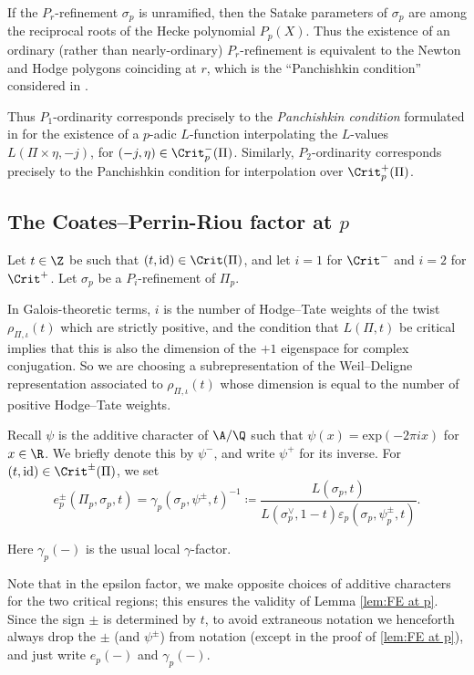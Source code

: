 \documentclass[10pt,reqno,a4paper]{amsart}
\begin{document}
  If the $P_r$-refinement $\sigma_p$ is unramified, then the Satake parameters of $\sigma_p$ are among the reciprocal roots of the Hecke polynomial $P_p(X)$. Thus the existence of an ordinary (rather than nearly-ordinary) $P_r$-refinement is equivalent to the Newton and Hodge polygons coinciding at $r$, which is the ``Panchishkin condition'' considered in \cite[Definition 5.5]{Pan94}.

  Thus $P_1$-ordinarity corresponds precisely to the \emph{Panchishkin condition} formulated in \cite{Pan94} for the existence of a $p$-adic $L$-function interpolating the $L$-values $L(\Pi \times \eta, -j)$, for $(-j, \eta) \in \Crit^-_p(\Pi)$. Similarly, $P_2$-ordinarity corresponds precisely to the Panchishkin condition for interpolation over $\Crit^+_p(\Pi)$.


 \subsection{The Coates--Perrin-Riou factor at \texorpdfstring{$p$}{p}}
  \label{sec:coates--perrin-riou}
  
  Let $t \in \Z$ be such that $(t, \mathrm{id}) \in \Crit(\Pi)$, and let $i = 1$ for $\Crit^-$ and $i = 2$ for $\Crit^+$. Let $\sigma_p$ be a $P_i$-refinement of $\Pi_p$.
  

  \begin{remark}
   In Galois-theoretic terms, $i$ is the number of Hodge--Tate weights of the twist $\rho_{\Pi, \iota}(t)$ which are strictly positive, and the condition that $L(\Pi, t)$ be critical implies that this is also the dimension of the $+1$ eigenspace for complex conjugation. So we are choosing a subrepresentation of the Weil--Deligne representation associated to $\rho_{\Pi, \iota}(t)$ whose dimension is equal to the number of positive Hodge--Tate weights.
  \end{remark}
  

  \begin{definition}\label{def:e_p}
  Recall $\psi$ is the additive character of $\A/\Q$ such that $\psi(x) = \mathrm{exp}(-2\pi i x)$ for $x \in \R$. We briefly denote this by $\psi^-$, and write $\psi^+$ for its inverse. 
   For $(t, \mathrm{id}) \in \Crit^\pm(\Pi)$, we set
   \[ e_p^\pm(\Pi_p, \sigma_p, t) = \gamma_p(\sigma_p, \psi^\pm, t)^{-1} \coloneqq \frac{L(\sigma_p, t)}{L(\sigma_p^\vee, 1 - t)\varepsilon_p(\sigma_p, \psi_p^\pm, t)} .\]
  \end{definition}

\begin{remark}
	    Here $\gamma_p(-)$ is the usual local $\gamma$-factor. 
	    
	    Note that in the epsilon factor, we make opposite choices of additive characters for the two critical regions; this ensures the validity of Lemma \ref{lem:FE at p}. 
	    Since the sign $\pm$ is determined by $t$, to avoid extraneous notation we henceforth always drop the $\pm$ (and $\psi^\pm$) from notation (except in the proof of \cref{lem:FE at p}), and just write $e_p(-)$ and $\gamma_p(-)$.
\end{remark}
\end{document}
